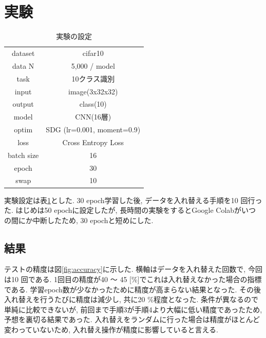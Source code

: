 \documentclass[twocolumn]{jarticle}     %
\begin{document}
\section{実験}

	\begin{table}[tb]
		\begin{center}
			\caption{実験の設定}
			\begin{tabular}{|c|c|} \hline
				dataset & cifar10 \\
				data N & 5,000 / model \\ \hline
				task & 10クラス識別 \\
				input & image(3x32x32) \\
				output & class(10) \\ \hline
				model & CNN(16層) \\
				optim & SDG (lr=0.001, moment=0.9) \\
				loss & Cross Entropy Loss \\ \hline
				batch size & 16 \\
				epoch & 30 \\ \hline
        swap & 10 \\ \hline
			\end{tabular}
			\label{tab:setting}
		\end{center}
	\end{table}

実験設定は表\ref{tab:setting}とした. 30 epoch学習した後, データを入れ替える手順を10 回行った. はじめは50 epochに設定したが, 長時間の実験をするとGoogle Colabがいつの間にか中断したため, 30 epochと短めにした.

\subsection{結果}

テストの精度は図\ref{fig:accuracy}に示した. 横軸はデータを入れ替えた回数で, 今回は10 回である. 1回目の精度が40 ～ 45 [\%]でこれは入れ替えなかった場合の指標である. 学習epoch数が少なかったために精度が高まらない結果となった. その後入れ替えを行うたびに精度は減少し, 共に20 \%程度となった. 条件が異なるので単純に比較できないが, 前回まで手順3が手順4より大幅に低い精度であったため, 予想を裏切る結果であった.
入れ替えをランダムに行った場合は精度がほとんど変わっていないため, 入れ替え操作が精度に影響していると言える.
\end{document}
